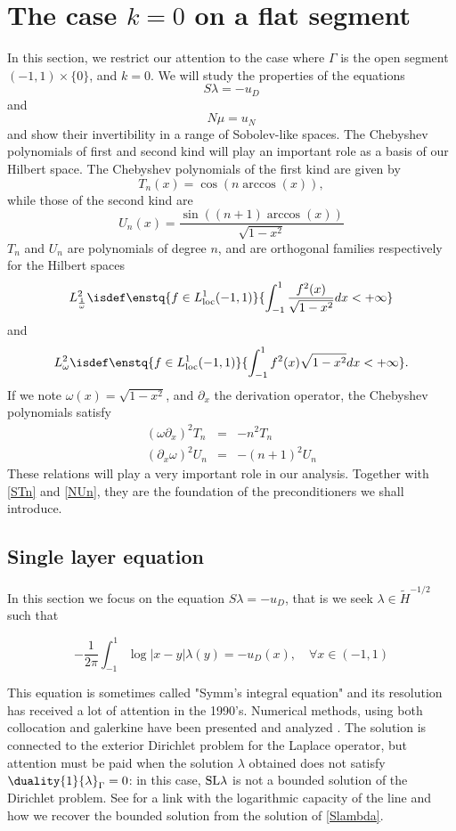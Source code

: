 \documentclass[]{article}
\begin{document}
\section{The case $k=0$ on a flat segment}

In this section, we restrict our attention to the case where $\Gamma$ is the open segment $(-1,1) \times \{0\}$, and $k=0$. We will study the properties of the equations 
\[S\lambda = -u_D\]
and 
\[N\mu = u_N\]
and show their invertibility in a range of Sobolev-like spaces. The Chebyshev polynomials of first and second kind will play an important role as a basis of our Hilbert space. 
The Chebyshev polynomials of the first kind are given by 
\[T_n(x) = \cos(n \arccos(x)),\]
while those of the second kind are 
\[U_n(x) = \dfrac{\sin((n+1) \arccos(x))}{\sqrt{1 - x^2}}\]
$T_n$ and $U_n$ are polynomials of degree $n$, and are orthogonal families respectively for the Hilbert spaces 
$$L^2_{\frac{1}{\omega}} \isdef \enstq{f \in L^1_\textup{loc}(-1,1)} {\int_{-1}^{1} \dfrac{f^2(x)}{\sqrt{1 - x^2} }dx< + \infty}$$
and 
$$L^2_{\omega} \isdef \enstq{f \in L^1_\textup{loc}(-1,1)} {\int_{-1}^{1} {f^2(x)}{\sqrt{1 - x^2} }dx< + \infty}.$$
If we note $\omega(x) = \sqrt{1-x^2}$, and $\partial_x$ the derivation operator, the Chebyshev polynomials satisfy
\begin{eqnarray}
	(\omega\partial_x)^2 T_n &=& -n^2T_n \label{cheb1}\\
	(\partial_x\omega)^2 U_n &=& -(n+1)^2U_n \label{cheb2}
\end{eqnarray}
These relations will play a very important role in our analysis. Together with \autoref{STn} and \autoref{NUn}, they are the foundation of the preconditioners we shall introduce. 

\subsection{Single layer equation}

In this section we focus on the equation $S\lambda = -u_D$, that is we seek $\lambda \in \tilde{H}^{-1/2}$ such that 

\begin{equation}
	-\frac{1}{2\pi}\int_{-1}^{1} \log|x-y| \lambda(y) = -u_D(x), \quad \forall x\in (-1,1)\label{Slambda}
\end{equation} 

This equation is sometimes called "Symm's integral equation" and its resolution has received a lot of attention in the 1990's. Numerical methods, using both collocation and galerkine have been presented and analyzed \cite{atkinson1991numerical,yan1988integral,yan1990cosine,sloan1992collocation,yan1989mesh}. The solution is connected to the exterior Dirichlet problem for the Laplace operator, but attention must be paid when the solution $\lambda$ obtained does not satisfy $\duality{1}{\lambda}_\Gamma = 0$: in this case, $\textup{SL}\lambda$ is not a bounded solution of the Dirichlet problem. See \cite{atkinson1991numerical} for a link with the logarithmic capacity of the line and how we recover the bounded solution from the solution of \eqref{Slambda}.
\end{document}
